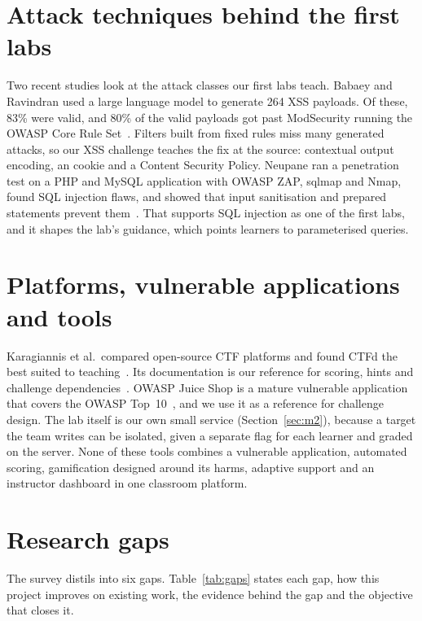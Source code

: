 \section{Attack techniques behind the first labs}

Two recent studies look at the attack classes our first labs teach. Babaey and Ravindran used a large language model to generate 264 XSS payloads. Of these, 83\% were valid, and 80\% of the valid payloads got past ModSecurity running the OWASP Core Rule Set~\cite{Babaey2025genxss}. Filters built from fixed rules miss many generated attacks, so our XSS challenge teaches the fix at the source: contextual output encoding, an  cookie and a Content Security Policy. Neupane ran a penetration test on a PHP and MySQL application with OWASP ZAP, sqlmap and Nmap, found SQL injection flaws, and showed that input sanitisation and prepared statements prevent them~\cite{Neupane2025sqli}. That supports SQL injection as one of the first labs, and it shapes the lab's guidance, which points learners to parameterised queries.

\section{Platforms, vulnerable applications and tools}

Karagiannis et al.\ compared open-source CTF platforms and found CTFd the best suited to teaching~\cite{Karagiannis2020analysis}. Its documentation is our reference for scoring, hints and challenge dependencies~\cite{CtfdDocs}. OWASP Juice Shop is a mature vulnerable application that covers the OWASP Top~10~\cite{OwaspJuiceShop}, and we use it as a reference for challenge design. The lab itself is our own small service (Section~\ref{sec:m2}), because a target the team writes can be isolated, given a separate flag for each learner and graded on the server. None of these tools combines a vulnerable application, automated scoring, gamification designed around its harms, adaptive support and an instructor dashboard in one classroom platform.

\section{Research gaps}
\label{sec:gaps}

The survey distils into six gaps. Table~\ref{tab:gaps} states each gap, how this project improves on existing work, the evidence behind the gap and the objective that closes it.

